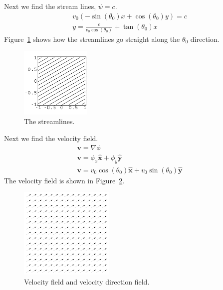 \begin{Example}
  Next we find the stream lines, $\psi = c$.
  \begin{gather*}
    v_0 ( -\sin(\theta_0) x + \cos(\theta_0) y ) = c
    \\
    y = \frac{c}{v_0 \cos(\theta_0)} + \tan(\theta_0) x
  \end{gather*}
  Figure~\ref{figure streamlines-v0eiqz} shows how the streamlines go straight
  along the $\theta_0$ direction.
  \begin{figure}[htb!]
    \begin{center}
      \includegraphics[width=0.3\textwidth]{fcv/analytic/streamlines-v0eiqz}
    \end{center}
    \caption{The streamlines.}
    \label{figure streamlines-v0eiqz}
  \end{figure}
  Next we find the velocity field.
  \begin{gather*}
    \mathbf{v} = \nabla \phi
    \\
    \mathbf{v} = \phi_x \hat{\mathbf{x}} + \phi_y \hat{\boldsymbol{y}}
    \\
    \mathbf{v} = v_0 \cos(\theta_0) \hat{\mathbf{x}} 
    + v_0 \sin(\theta_0) \hat{\boldsymbol{y}}
  \end{gather*}
  The velocity field is shown in
  Figure~\ref{figure velocity-field-v0eiqz}.
  \begin{figure}[htb!]
    \begin{center}
      \includegraphics[width=0.4\textwidth]{fcv/analytic/velocity-field-v0eiqz}
    \end{center}
    \caption{Velocity field and velocity direction field.}
    \label{figure velocity-field-v0eiqz}
  \end{figure}
\end{Example}









